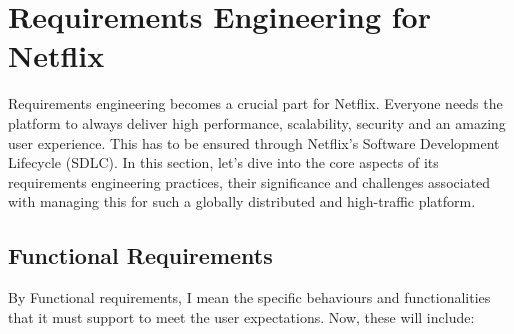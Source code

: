 \documentclass[a4paper,10pt,twoside]{article}
\begin{document}
\section{Requirements Engineering for Netflix}
Requirements engineering becomes a crucial part for Netflix. Everyone needs the platform to always deliver high performance, scalability, security and an amazing user experience. This has to be ensured through Netflix’s Software Development Lifecycle (SDLC). In this section, let’s dive into the core aspects of its requirements engineering practices, their significance and challenges associated with managing this for such a globally distributed and high-traffic platform.
\subsection{Functional Requirements}
By Functional requirements, I mean the specific behaviours and functionalities that it must support to meet the user expectations. Now, these will include:
\end{document}
